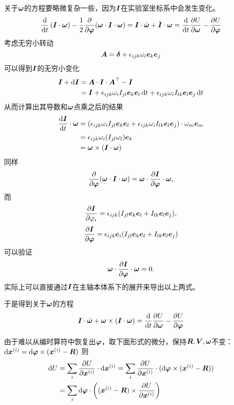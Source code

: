 \documentclass[UTF8, a4paper]{ctexart}
\renewcommand*{\dd}{\mathop{}\!\mathrm{d}}
\begin{document}
关于$\vb*{\omega}$的方程要略微复杂一些，因为$\vb*{I}$在实验室坐标系中会发生变化。
\[
    \dv{t} \left( \vb*{I} \cdot \vb*{\omega} \right) - \frac{1}{2} \pdv{\vb*{\varphi}} (\vb*{\omega} \cdot \vb*{I} \cdot \vb*{\omega}) = \vb*{I} \cdot \dot{\vb*{\omega}} + \dot{\vb*{I}} \cdot \vb*{\omega} = \dv{t} \pdv{U}{\vb*{\omega}} - \pdv{U}{\vb*{\varphi}}
\]
考虑无穷小转动
\[
    \vb*{A} = \vb*{\delta} + \epsilon_{ijk} \omega_i \vb*{e}_k \vb*{e}_j
\]
可以得到$\vb*{I}$的无穷小变化
\[
    \begin{aligned}
        \vb*{I} + \dd \vb*{I} &= \vb*{A} \cdot \vb*{I} \cdot \vb*{A}^\top - \vb*{I} \\
        &= \vb*{I} + \epsilon_{ijk} \omega_i I_{jl} \vb*{e}_k \vb*{e}_l \dd t + \epsilon_{ijk} \omega_i I_{lk} \vb*{e}_l \vb*{e}_j \dd t
    \end{aligned}
\]
从而计算出其导数和$\vb*{\omega}$点乘之后的结果
\[
    \begin{aligned}
        \dv{\vb*{I}}{t} \cdot \vb*{\omega} &= (\epsilon_{ijk} \omega_i I_{jl} \vb*{e}_k \vb*{e}_l + \epsilon_{ijk} \omega_i I_{lk} \vb*{e}_l \vb*{e}_j) \cdot \omega_m \vb*{e}_m \\
        &= \epsilon_{ijk} \omega_i (I_{jl} \omega_l) \vb*{e}_k \\
        &= \vb*{\omega} \times (\vb*{I} \cdot \vb*{\omega})
    \end{aligned}
\]
同样
\[
    \pdv{\vb*{\varphi}} (\vb*{\omega} \cdot \vb*{I} \cdot \vb*{\omega}) = \vb*{\omega} \cdot \pdv{\vb*{I}}{\vb*{\varphi}} \cdot \vb*{\omega},
\]
而
\[
    \pdv{\vb*{I}}{\varphi_i} = \epsilon_{ijk} (I_{jl} \vb*{e}_k \vb*{e}_l + I_{lk} \vb*{e}_l \vb*{e}_j),
\]
\[
    \pdv{\vb*{I}}{\vb*{\varphi}} = \epsilon_{ijk} \vb*{e}_i (I_{jl} \vb*{e}_k \vb*{e}_l + I_{lk} \vb*{e}_l \vb*{e}_j) 
\]
可以验证
\[
    \vb*{\omega} \cdot \pdv{\vb*{I}}{\vb*{\varphi}} \cdot \vb*{\omega} = 0.
\]
实际上可以直接通过$\vb*{I}$在主轴本体系下的展开来导出以上两式。

于是得到关于$\vb*{\omega}$的方程
\begin{equation}
    \vb*{I} \cdot \dot{\vb*{\omega}} + \vb*{\omega} \times (\vb*{I} \cdot \vb*{\omega}) = \dv{t} \pdv{U}{\vb*{\omega}} - \pdv{U}{\vb*{\varphi}}
    \label{eq:origin-omega-motion}
\end{equation}

由于难以从编时算符中恢复出$\vb*{\varphi}$，取下面形式的微分，保持$\vb*{R},\vb*{V}, \vb*{\omega}$不变：
$\dd \vb*{x}^{(i)} = \dd \vb*{\varphi} \times (\vb*{x}^{(i)} - \vb*{R})$
则
\[
    \begin{aligned}
        \dd U &= \sum_i \pdv{U}{\vb*{x}^{(i)}} \cdot \dd \vb*{x}^{(i)} = \sum_i  \pdv{U}{\vb*{x}^{(i)}} \cdot (\dd \vb*{\varphi} \times (\vb*{x}^{(i)} - \vb*{R})) \\
        &= \sum_i \dd \vb*{\varphi} \cdot \left( (\vb*{x}^{(i)} - \vb*{R}) \times \pdv{U}{\vb*{x}^{(i)}} \right)
    \end{aligned}
\]
\end{document}
